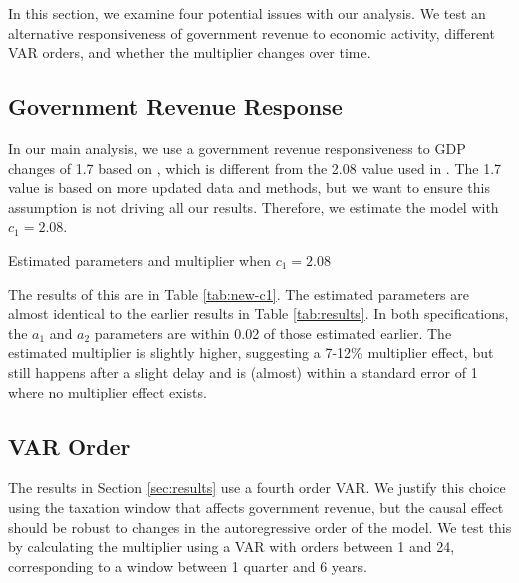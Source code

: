 In this section, we examine four potential issues with our analysis. We test an alternative responsiveness of government revenue to economic activity, different VAR orders, and whether the multiplier changes over time. 


\subsection{Government Revenue Response}

In our main analysis, we use a government revenue responsiveness to GDP changes of 1.7 based on \textcite{lutz2010fiscal}, which is different from the 2.08 value used in \textcite{blanchard2002empirical}. The 1.7 value is based on more updated data and methods, but we want to ensure this assumption is not driving all our results. Therefore, we estimate the model with $c_1 = 2.08$.

\begin{table}[t]
    \centering
    \caption{Estimated parameters and multiplier when $c_1 = 2.08$}
    
    \label{tab:new-c1}
\end{table}

The results of this are in Table \ref{tab:new-c1}. The estimated parameters are almost identical to the earlier results in Table \ref{tab:results}. In both specifications, the $a_1$ and $a_2$ parameters are within 0.02 of those estimated earlier. The estimated multiplier is slightly higher, suggesting a 7-12\% multiplier effect, but still happens after a slight delay and is (almost) within a standard error of 1 where no multiplier effect exists.


\subsection{VAR Order}

The results in Section \ref{sec:results} use a fourth order VAR. We justify this choice using the taxation window that affects government revenue, but the causal effect should be robust to changes in the autoregressive order of the model. We test this by calculating the multiplier using a VAR with orders between 1 and 24, corresponding to a window between 1 quarter and 6 years.

